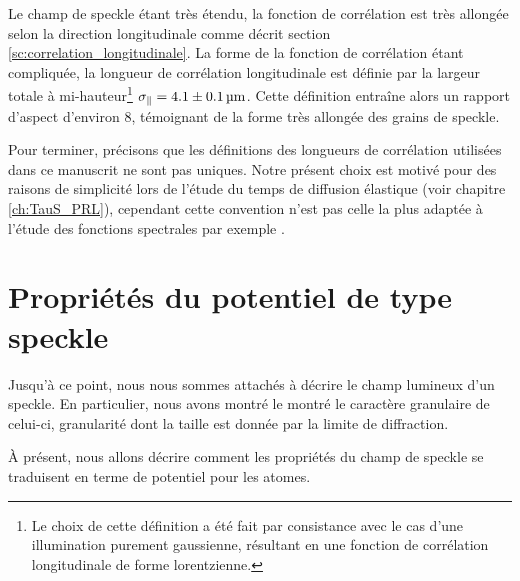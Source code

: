 Le champ de speckle étant très étendu, la fonction de corrélation est très allongée selon la direction longitudinale comme décrit section \ref{sc:correlation_longitudinale}. La forme de la fonction de corrélation étant compliquée, la longueur de corrélation longitudinale est définie par la largeur totale à mi-hauteur\footnote{Le choix de cette définition a été fait par consistance avec le cas d'une illumination purement gaussienne, résultant en une fonction de corrélation longitudinale de forme lorentzienne.} $\sigma_{\parallel}=4.1\pm\SI{0.1}{\micro\metre}$. Cette définition entraîne alors un rapport d'aspect d'environ 8, témoignant de la forme très allongée des grains de speckle.




Pour terminer, précisons que les définitions des longueurs de corrélation utilisées dans ce manuscrit ne sont pas uniques. Notre présent choix est motivé pour des raisons de simplicité lors de l'étude du temps de diffusion élastique (voir chapitre \ref{ch:TauS_PRL}), cependant cette convention n'est pas celle la plus adaptée à l'étude des fonctions spectrales par exemple \citep{volchkov2018measurement}\citep{pasek2017anderson}. 














\section{Propriétés du potentiel de type speckle}
\label{sc:potentiel_speckle}
Jusqu'à ce point, nous nous sommes attachés à décrire le champ lumineux d'un speckle. En particulier, nous avons montré le montré le caractère granulaire de celui-ci, granularité dont la taille est donnée par la limite de diffraction. 

À présent, nous allons décrire comment les propriétés du champ de speckle se traduisent en terme de potentiel pour les atomes. 

